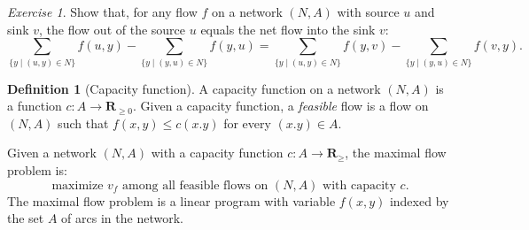 \documentclass{amsbook}
\newcommand{\RR}{\mathbf R}
\theoremstyle{definition}
\newtheorem{definition}[theorem]{Definition}
\theoremstyle{remark}
\newtheorem{exercise}[theorem]{Exercise}
\begin{document}
\begin{exercise}
  Show that, for any flow $f$ on a network $(N,A)$ with source $u$ and sink $v$, the flow out of the source $u$ equals the net flow into the sink $v$:
  \begin{displaymath}
    \sum_{\{y\mid (u,y)\in N\}} f(u,y) - \sum_{\{y\mid (y,u)\in N\}} f(y,u) = \sum_{\{y\mid (u,y)\in N\}} f(y,v) - \sum_{\{y\mid (y,u)\in N\}} f(v,y).
  \end{displaymath}
\end{exercise}
\begin{definition}
  [Capacity function]
  A capacity function on a network $(N,A)$ is a function $c:A\to \RR_{\geq 0}$.
  Given a capacity function, a \emph{feasible} flow is a flow on $(N,A)$ such that $f(x,y)\leq c(x.y)$ for every $(x.y)\in A$.
\end{definition}
Given a network $(N,A)$ with a capacity function $c:A\to \RR_{\geq}$, the maximal flow problem is:
\begin{equation}
  \label{eq:flowmax}
  \tag{F}
  \text{maximize $v_f$ among all feasible flows on $(N,A)$ with capacity $c$.}
\end{equation}
The maximal flow problem is a linear program with variable $f(x,y)$ indexed by the set $A$ of arcs in the network.


\end{document}
